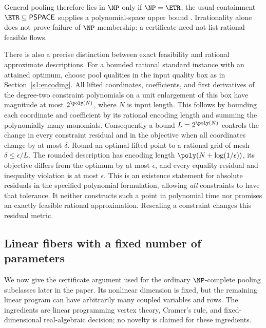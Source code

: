 General pooling therefore lies in $\NP$ only if $\NP=\ETR$;
the usual containment $\ETR\subseteq\mathsf{PSPACE}$ supplies a
polynomial-space upper bound
\citep[Section~1.1]{abrahamsen2019-dynamic-toolbox-for-etrinv}.
Irrationality alone does not prove failure of $\NP$ membership:
a certificate need not list rational feasible flows.

There is also a precise distinction between exact feasibility and
rational approximate descriptions. For a bounded rational standard
instance with an attained optimum, choose pool qualities in the input
quality box as in Section~\ref{s1:encoding}. All lifted coordinates,
coefficients, and first derivatives of the degree-two constraint
polynomials on a unit enlargement of this box have magnitude at most
$2^{\poly(N)}$, where $N$ is input length. This follows by bounding
each coordinate and coefficient by its rational encoding length and
summing the polynomially many monomials. Consequently a bound
$L=2^{\poly(N)}$ controls the change in every constraint residual and
in the objective when all coordinates change by at most $\delta$.
Round an optimal lifted point to a rational grid of mesh
$\delta\le\epsilon/L$. The rounded description has encoding length
$\poly(N+\log(1/\epsilon))$, its objective differs from the optimum
by at most $\epsilon$, and every equality residual and inequality
violation is at most $\epsilon$. This is an existence statement for
absolute residuals in the specified polynomial formulation, allowing
\emph{all} constraints to have that tolerance. It neither constructs
such a point in polynomial time nor promises an exactly feasible
rational approximation. Rescaling a constraint changes this residual
metric.

\subsection{Linear fibers with a fixed number of parameters}\label{s2:fibers}

We now give the certificate argument used for the ordinary
$\NP$-complete pooling subclasses later in the paper. Its nonlinear
dimension is fixed, but the remaining linear program can have
arbitrarily many coupled variables and rows. The ingredients are
linear programming vertex theory, Cramer's rule, and fixed-dimensional
real-algebraic decision; no novelty is claimed for these ingredients.

